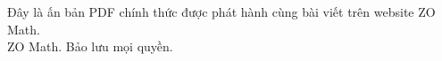 \begin{center}
  \href{\zoPdfCanonicalUrl}{\qrcode[height=17mm]{\zoPdfCanonicalUrl}}\par
  \vspace{0.55em}
  {\small\bfseries\href{\zoPdfCanonicalUrl}{\zoPdfDisplayUrl}\par}
  \vspace{0.8em}
  \begin{minipage}{0.84\textwidth}
    \centering
    \small\color{zomathgray}
    Đây là ấn bản PDF chính thức được phát hành cùng bài viết trên website ZO Math.\\[0.3em]
    \textcopyright{} \the\year{} ZO Math. Bảo lưu mọi quyền.
  \end{minipage}
\end{center}
\clearpage
